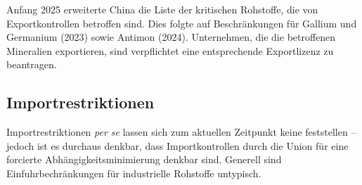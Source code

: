 \documentclass[12pt,a4paper,oneside]{book} %
\begin{document}
{	Anfang 2025 erweiterte China die Liste der kritischen Rohstoffe, die von Exportkontrollen betroffen sind.\autocite{https://www.reuters.com/world/china/chinas-export-controls-are-curbing-critical-mineral-shipments-world-2025-04-20/} Dies folgte auf Beschränkungen für Gallium und Germanium (2023) sowie Antimon (2024). Unternehmen, die die betroffenen Mineralien exportieren, sind verpflichtet eine entsprechende Exportlizenz zu beantragen.\autocite[Dessen Beantragung veranschlagt sechs Wochen;]{Wolf. Edda: China führt Exportauflagen für kritische Metalle ein, GTA}
	
	
	\subsection{Importrestriktionen}
	Importrestriktionen \textit{per se} lassen sich zum aktuellen Zeitpunkt keine feststellen -- jedoch ist es durchaus denkbar, dass Importkontrollen durch die Union für eine forcierte Abhängigkeitsminimierung denkbar sind. Generell sind Einfuhrbechränkungen für industrielle Rohstoffe untypisch.\autocite{Schorkopf, Rohstoffverwaltung, Rn. 37}
	
}
\end{document}
